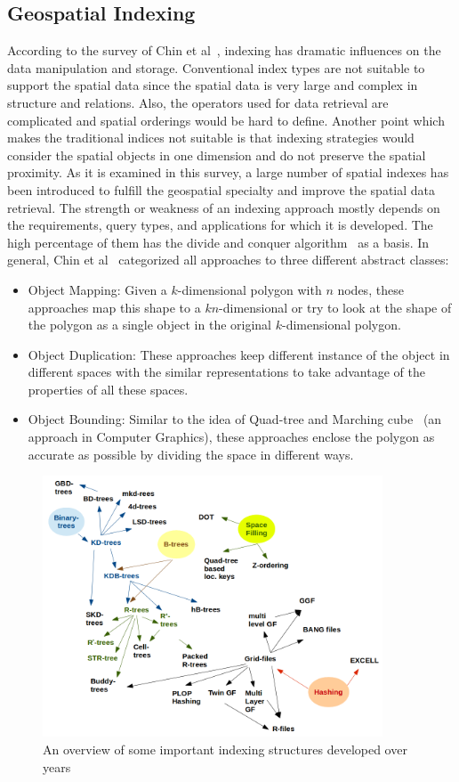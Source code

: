 \documentclass[a4paper,12pt]{article}
\begin{document}
\subsection{Geospatial Indexing}
\label{s.geospatial-index}
According to the survey of Chin et al~\cite{survey}, indexing has dramatic influences on the data manipulation and storage. Conventional index types are not suitable to support the spatial data since the spatial data is very large and complex in structure and relations. Also, the operators used for data retrieval are complicated and spatial orderings would be hard to define. Another point which makes the traditional indices not suitable is that indexing strategies would consider the spatial objects in one dimension and do not preserve the spatial proximity.
As it is examined in this survey, a large number of spatial indexes has been introduced to fulfill the geospatial specialty and improve the spatial data retrieval. The strength or weakness of an indexing approach mostly depends on the requirements, query types, and applications for which it is developed. 
The high percentage of them has the divide and conquer algorithm~\cite{divconquer} as a basis. 
In general, Chin et al~\cite{survey} categorized all approaches to three different abstract classes:
\begin{itemize}
\item Object Mapping: Given a $k$-dimensional polygon with $n$ nodes, these approaches map this shape to a $kn$-dimensional or try to look at the shape of the polygon as a single object in the original $k$-dimensional polygon.   
\item Object Duplication: These approaches keep different instance of the object in different spaces with the similar representations to take advantage of the properties of all these spaces. 
\item Object Bounding: Similar to the idea of Quad-tree and Marching cube~\cite{marchingcube} (an approach in Computer Graphics), 
these approaches enclose the polygon as accurate as possible by dividing the space in different ways. 
\end{itemize}

\begin{figure}
\centering
\includegraphics[width=0.9\textwidth]{Trees}
\caption{An overview of some important indexing structures developed over years}
\label{trees}
\end{figure}
\end{document}
